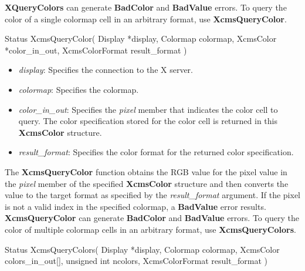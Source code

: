 \documentclass{report}
\begin{document}
\begin{itemize}
            \bigbreak \noindent
            \textbf{XQueryColors} can generate \textbf{BadColor} and \textbf{BadValue} errors.
            \bigbreak \noindent
            To query the color of a single colormap cell in an arbitrary format, use \textbf{XcmsQueryColor}.
            \bigbreak \noindent
            \begin{cppcode}
                Status XcmsQueryColor(
                    Display *display,
                    Colormap colormap,
                    XcmsColor *color_in_out,
                    XcmsColorFormat result_format
                )
            \end{cppcode}
            \begin{itemize}
                \item \textit{display}: Specifies the connection to the X server.
                \item \textit{colormap}: Specifies the colormap.
                \item \textit{color\_in\_out}: Specifies the \textit{pixel} member that indicates the color cell to query. The color specification stored for the color cell is returned in this \textbf{XcmsColor} structure.
                \item \textit{result\_format}: Specifies the color format for the returned color specification.
            \end{itemize}
            \noindent
            The \textbf{XcmsQueryColor} function obtains the RGB value for the pixel value in the \textit{pixel} member of the specified \textbf{XcmsColor} structure and then converts the value to the target format as specified by the \textit{result\_format} argument. If the pixel is not a valid index in the specified colormap, a \textbf{BadValue} error results.
            \bigbreak \noindent
            \textbf{XcmsQueryColor} can generate \textbf{BadColor} and \textbf{BadValue} errors.
            \bigbreak \noindent
            To query the color of multiple colormap cells in an arbitrary format, use \textbf{XcmsQueryColors}.
            \bigbreak \noindent 
            \begin{cppcode}
                Status XcmsQueryColors(
                    Display *display,
                    Colormap colormap,
                    XcmsColor colors_in_out[],
                    unsigned int ncolors,
                    XcmsColorFormat result_format
                )
            \end{cppcode}
            \begin{itemize}

\end{itemize}
\end{itemize}
\end{document}
